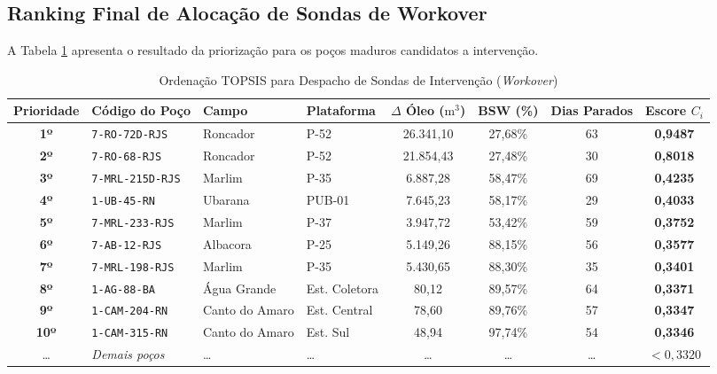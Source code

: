 \documentclass[12pt,a4paper]{article}
\begin{document}
\subsection{Ranking Final de Alocação de Sondas de Workover}
A Tabela \ref{tab:topsis} apresenta o resultado da priorização para os poços maduros candidatos a intervenção.

\begin{table}[htbp]
\centering
\small
\caption{Ordenação TOPSIS para Despacho de Sondas de Intervenção (\textit{Workover})}
\label{tab:topsis}
\begin{tabular}{clllcccc}
\toprule
\textbf{Prioridade} & \textbf{Código do Poço} & \textbf{Campo} & \textbf{Plataforma} & \textbf{$\Delta$ Óleo ($\text{m}^3$)} & \textbf{BSW (\%)} & \textbf{Dias Parados} & \textbf{Escore $C_i$} \\
\midrule
\textbf{1º} & \texttt{7-RO-72D-RJS} & Roncador & P-52 & 26.341,10 & 27,68\% & 63 & \textbf{0,9487} \\
\textbf{2º} & \texttt{7-RO-68-RJS} & Roncador & P-52 & 21.854,43 & 27,48\% & 30 & \textbf{0,8018} \\
\textbf{3º} & \texttt{7-MRL-215D-RJS} & Marlim & P-35 & 6.887,28 & 58,47\% & 69 & \textbf{0,4235} \\
\textbf{4º} & \texttt{1-UB-45-RN} & Ubarana & PUB-01 & 7.645,23 & 58,17\% & 29 & \textbf{0,4033} \\
\textbf{5º} & \texttt{7-MRL-233-RJS} & Marlim & P-37 & 3.947,72 & 53,42\% & 59 & \textbf{0,3752} \\
\textbf{6º} & \texttt{7-AB-12-RJS} & Albacora & P-25 & 5.149,26 & 88,15\% & 56 & \textbf{0,3577} \\
\textbf{7º} & \texttt{7-MRL-198-RJS} & Marlim & P-35 & 5.430,65 & 88,30\% & 35 & \textbf{0,3401} \\
\textbf{8º} & \texttt{1-AG-88-BA} & Água Grande & Est. Coletora & 80,12 & 89,57\% & 64 & \textbf{0,3371} \\
\textbf{9º} & \texttt{1-CAM-204-RN} & Canto do Amaro & Est. Central & 78,60 & 89,76\% & 57 & \textbf{0,3347} \\
\textbf{10º} & \texttt{1-CAM-315-RN} & Canto do Amaro & Est. Sul & 48,94 & 97,74\% & 54 & \textbf{0,3346} \\
\dots & \textit{Demais poços} & \dots & \dots & \dots & \dots & \dots & $< 0,3320$ \\
\bottomrule
\end{tabular}
\end{table}
\end{document}
